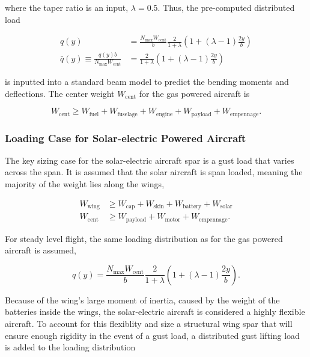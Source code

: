 \documentclass[]{aiaa-tc}%
\begin{document}
where the taper ratio is an input, $\lambda=0.5$.  Thus, the pre-computed distributed load 

\begin{align}
    \label{e:qbar}
    q(y) &= \frac{N_{\text{max}}W_{\text{cent}}}{b}\frac{2}{1+\lambda} \left( 1 + (\lambda - 1) \frac{2y}{b} \right) \\
    \bar{q}(y) \equiv \frac{q(y)b}{N_{\text{max}}W_{\text{cent}}} &= \frac{2}{1+\lambda} \left( 1 + (\lambda - 1) \frac{2y}{b} \right)
\end{align}

is inputted into a standard beam model to predict the bending moments and deflections. The center weight $W_{\text{cent}}$ for the gas powered aircraft is

\begin{equation}
    W_{\text{cent}} \geq W_{\text{fuel}} + W_{\text{fuselage}} + W_{\text{engine}} + W_{\text{payload}} + W_{\text{empennage}}.
\end{equation}

\subsubsection{Loading Case for Solar-electric Powered Aircraft}

The key sizing case for the solar-electric aircraft spar is a gust load that varies across the span.  
It is assumed that the solar aircraft is span loaded, meaning the majority of the weight lies along the wings, 

\begin{align}
    W_{\text{wing}} &\geq W_{\text{cap}} + W_{\text{skin}} + W_{\text{battery}} + W_{\text{solar}}\\
    W_{\text{cent}} &\geq W_{\text{payload}} + W_{\text{motor}} + W_{\text{empennage}}.
\end{align}

For steady level flight, the same loading distribution as for the gas powered aircraft is assumed,

\begin{equation}
    \label{e:qbar}
    q(y) = \frac{N_{\text{max}}W_{\text{cent}}}{b}\frac{2}{1+\lambda} \left( 1 + (\lambda - 1) \frac{2y}{b} \right).
\end{equation}

Because of the wing's large moment of inertia, caused by the weight of the batteries inside the wings, the solar-electric aircraft is considered a highly flexible aircraft. 
To account for this flexiblity and size a structural wing spar that will ensure enough rigidity in the event of a gust load, a distributed gust lifting load is added to the loading distribution
\end{document}
